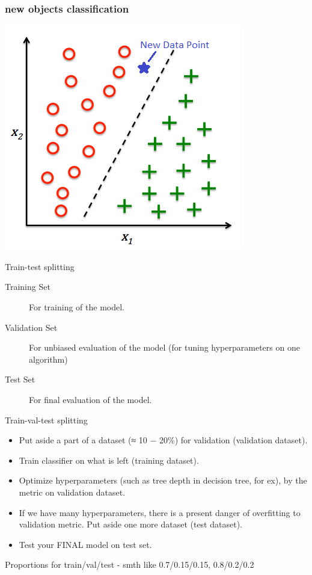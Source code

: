 \documentclass[svgnames]{beamer}
\begin{document}
\begin{frame}
  \frametitle{new objects classification}
  \centering
  \includegraphics[height=.8\textheight]{new-data-point}
\end{frame}

\begin{frame}{Train-test splitting}
  \begin{description}
    \item[Training Set]
For training of the model.

\item[Validation Set]
 For unbiased evaluation of the model (for tuning hyperparameters on one algorithm)

\item[Test Set]
    For final evaluation of the model.
    
  \end{description}
\end{frame}


\begin{frame}{Train-val-test splitting}
  \begin{itemize}
\item Put aside a part of a dataset (≈ 10 − 20\%) for validation (validation dataset).

\item Train classifier on what is left (training dataset).

\item Optimize hyperparameters (such as tree depth in decision tree, for ex), by the metric on validation
dataset.

\item If we have many hyperparameters, there is a present danger of overfitting to
validation metric. Put aside one more dataset (test dataset).

\item Test your FINAL model on test set.
\end{itemize}

Proportions for train/val/test - smth like 0.7/0.15/0.15, 0.8/0.2/0.2
 \end{frame}
\end{document}
